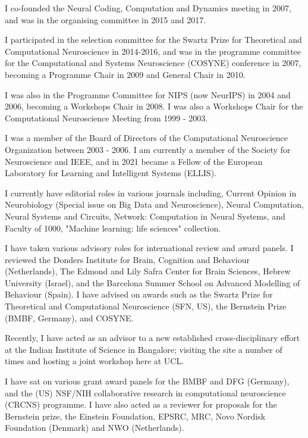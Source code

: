 I co-founded the Neural Coding, Computation and Dynamics meeting in 2007, and was in the organising committee in 2015 and 2017. 

I participated in the selection committee for the Swartz Prize for Theoretical and Computational Neuroscience in 2014-2016, and was in the programme committee for the Computational and Systems Neuroscience (COSYNE) conference in 2007, becoming a  Programme Chair in 2009 and General Chair in 2010. 

I was also in the Programme Committee for NIPS (now NeurIPS) in 2004 and 2006, becoming a Workshops Chair in 2008. I was also a Workshops Chair for the Computational Neuroscience Meeting from 1999 - 2003. 

I was a member of the Board of Directors of the Computational Neuroscience Organization between 2003 - 2006. I am currently a member of the Society for Neuroscience and IEEE, and in 2021 became a Fellow of the European Laboratory for Learning and Intelligent Systems (ELLIS). 

I currently have editorial roles in various journals including, Current Opinion in Neurobiology (Special issue on Big Data and Neuroscience), Neural Computation, Neural Systems and Circuits, Network:
Computation in Neural Systems, and Faculty of
1000, "Machine learning: life sciences" collection. 

I have taken various advisory roles for international review and award panels. I reviewed the Donders Institute for Brain, Cognition and Behaviour (Netherlands), The Edmond and Lily Safra Center for Brain Sciences, Hebrew
University (Israel), and the Barcelona Summer School on Advanced Modelling of Behaviour (Spain). I have advised on awards such as the Swartz Prize for Theoretical and Computational Neuroscience (SFN, US), the Bernstein Prize (BMBF, Germany), and COSYNE.

Recently, I have acted as an advisor to a new established cross-disciplinary effort at the Indian Institute of Science in Bangalore; visiting the site a
number of times and hosting a joint workshop here at UCL.

I have sat on various grant award panels for the BMBF and DFG (Germany), and the (US) NSF/NIH collaborative research
in computational neuroscience (CRCNS) programme. I have also acted as a reviewer for proposals for the Bernstein prize, the Einstein Foundation, EPSRC, MRC, Novo Nordisk Foundation (Denmark) and NWO (Netherlands).




